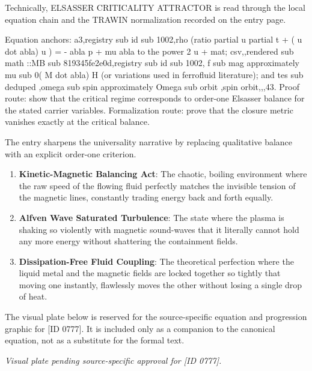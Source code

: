 Technically, ELSASSER CRITICALITY ATTRACTOR is read through the local equation chain and the TRAWIN normalization recorded on the entry page.

Equation anchors: a3,registry sub id sub 1002,rho (ratio partial u partial t + ( u dot abla) u ) = - abla p + mu abla to the power 2 u + mat; csv,,rendered sub math ::MB sub 819345fe2e0d,registry sub id sub 1002, f sub mag approximately mu sub 0( M dot abla) H (or variations used in ferrofluid literature); and tes sub deduped ,omega sub spin approximately Omega sub orbit ,spin orbit,,,43. Proof route: show that the critical regime corresponds to order-one Elsasser balance for the stated carrier variables. Formalization route: prove that the closure metric vanishes exactly at the critical balance.

The entry sharpens the universality narrative by replacing qualitative balance with an explicit order-one criterion.
\endgroup

\begin{enumerate}[leftmargin=1.6em,itemsep=6pt,topsep=4pt]
\item \textbf{Kinetic-Magnetic Balancing Act}: The chaotic, boiling environment where the raw speed of the flowing fluid perfectly matches the invisible tension of the magnetic lines, constantly trading energy back and forth equally.
\item \textbf{Alfven Wave Saturated Turbulence}: The state where the plasma is shaking so violently with magnetic sound-waves that it literally cannot hold any more energy without shattering the containment fields.
\item \textbf{Dissipation-Free Fluid Coupling}: The theoretical perfection where the liquid metal and the magnetic fields are locked together so tightly that moving one instantly, flawlessly moves the other without losing a single drop of heat.
\end{enumerate}

\begingroup\footnotesize\sloppy
The visual plate below is reserved for the source-specific equation and progression graphic for [ID 0777]. It is included only as a companion to the canonical equation, not as a substitute for the formal text.
\par\endgroup
\begingroup\footnotesize\itshape
Visual plate pending source-specific approval for [ID 0777].
\par\endgroup


